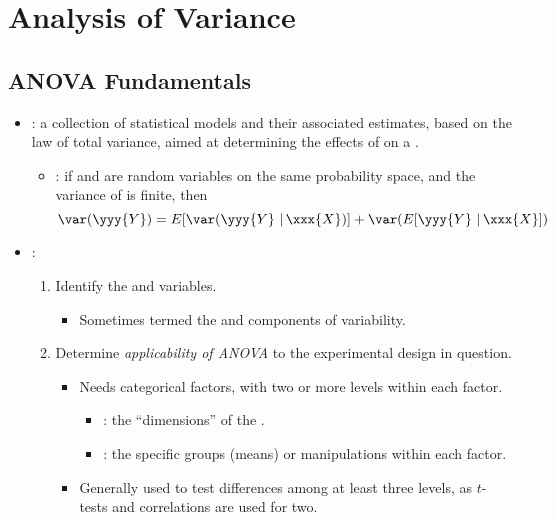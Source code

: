 \chapter{Analysis of Variance}

\section{ANOVA Fundamentals}
\begin{itemize}
  \item {}: a collection of statistical models and their associated estimates, based on the law of total variance, aimed at determining the effects of  on a .
    \begin{itemize}
      \item {}: if  and  are random variables on the same probability space, and the variance of  is finite, then
      \[%
      \var(\yyy{Y}) = E[\var(\yyy{Y}~|\,\xxx{X})] + \var(E[\yyy{Y}~|\,\xxx{X}])
      \]%
    \end{itemize}
  \item {}:
    \begin{enumerate}
      \item Identify the  and  variables.
      \begin{itemize}
        \item Sometimes termed the  and  components of variability.
      \end{itemize}
      \item Determine \emph{applicability of ANOVA} to the experimental design in question.
        \begin{itemize}
          \item Needs categorical factors, with two or more levels within each factor.
            \begin{itemize}
              \item {}: the ``dimensions'' of the .
              \item {}: the specific groups (means) or manipulations within each factor.
            \end{itemize}
          \item Generally used to test differences among at least three levels, as \(t\)-tests and correlations are used for two.

\end{itemize}
\end{enumerate}
\end{itemize}
